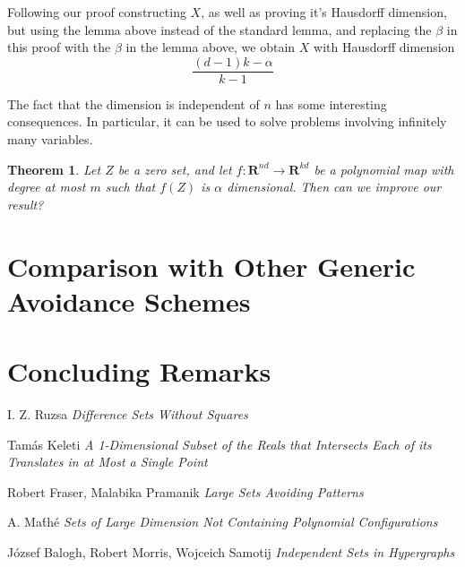 \documentclass{article}
\theoremstyle{plain}
\theoremstyle{plain}
\newtheorem{theorem}{Theorem}
\begin{document}
\begin{multicols}{2}
Following our proof constructing $X$, as well as proving it's Hausdorff dimension, but using the lemma above instead of the standard lemma, and replacing the $\beta$ in this proof with the $\beta$ in the lemma above, we obtain $X$ with Hausdorff dimension
%
\[ \frac{(d-1)k - \alpha}{k-1} \]
%

The fact that the dimension is independent of $n$ has some interesting consequences. In particular, it can be used to solve problems involving infinitely many variables.

\begin{theorem}
	Let $Z$ be a zero set, and let $f: \mathbf{R}^{nd} \to \mathbf{R}^{kd}$ be a polynomial map with degree at most $m$ such that $f(Z)$ is $\alpha$ dimensional. Then can we improve our result?
\end{theorem}

\section{Comparison with Other Generic Avoidance Schemes}

\section{Concluding Remarks}

\begin{thebibliography}{9}

I. Z. Ruzsa
\textit{Difference Sets Without Squares}

Tam\'{a}s Keleti
\textit{A 1-Dimensional Subset of the Reals that Intersects Each of its Translates in at Most a Single Point}

Robert Fraser, Malabika Pramanik
\textit{Large Sets Avoiding Patterns}

A. Ma\'{t}h\'{e}
\textit{Sets of Large Dimension Not Containing Polynomial Configurations}

J\'{o}zsef Balogh, Robert Morris, Wojceich Samotij
\textit{Independent Sets in Hypergraphs}

\end{thebibliography}

\end{multicols}
\end{document}
